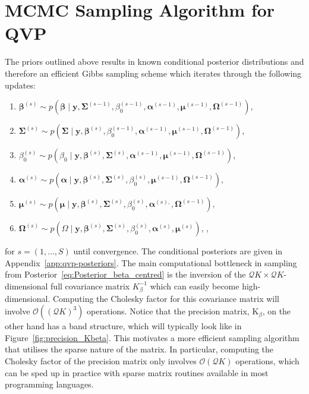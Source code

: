 \section{MCMC Sampling Algorithm for QVP}\label{sec:mcmc}
%
The priors outlined above results in known conditional posterior distributions and therefore an efficient Gibbs sampling scheme which iterates through the following updates:
\begin{enumerate}
    \item $\boldsymbol{\beta}^{(s)} \sim p(\boldsymbol{\beta}\mid \boldsymbol{y},\boldsymbol{\Sigma}^{(s-1)},\beta_0^{(s-1)},\boldsymbol{\alpha}^{(s-1)},\boldsymbol{\mu}^{(s-1)},\boldsymbol{\Omega}^{(s-1)} )$,
    \item $\boldsymbol{\Sigma}^{(s)} \sim p(\boldsymbol{\Sigma}\mid \boldsymbol{y},\boldsymbol{\beta}^{(s)},\beta_0^{(s-1)},\boldsymbol{\alpha}^{(s-1)},\boldsymbol{\mu}^{(s-1)}, \boldsymbol{\Omega}^{(s-1)})$, 
    \item $\beta_0^{(s)} \sim p(\beta_0\mid \boldsymbol{y},\boldsymbol{\beta}^{(s)},\boldsymbol{\Sigma}^{(s)},\boldsymbol{\alpha}^{(s-1)},\boldsymbol{\mu}^{(s-1)},\boldsymbol{\Omega}^{(s-1)} )$, 
    \item $\boldsymbol{\alpha}^{(s)} \sim p(\boldsymbol{\alpha} \mid \boldsymbol{y},\boldsymbol{\beta}^{(s)},\boldsymbol{\Sigma}^{(s)},\beta_0^{(s)},\boldsymbol{\mu}^{(s-1)},\boldsymbol{\Omega}^{(s-1)} )$, 
    \item $\boldsymbol{\mu}^{(s)} \sim p(\boldsymbol{\mu} \mid \boldsymbol{y},\boldsymbol{\beta}^{(s)},\boldsymbol{\Sigma}^{(s)},\beta_0^{(s)},\boldsymbol{\alpha}^{(s),},\boldsymbol{\Omega}^{(s-1)})$, 
    \item $\boldsymbol{\Omega}^{(s)} \sim p(\Omega\mid \boldsymbol{y},\boldsymbol{\beta}^{(s)},\boldsymbol{\Sigma}^{(s)},\beta_0^{(s)},\boldsymbol{\alpha}^{(s)},\boldsymbol{\mu}^{(s)} )$, ,
\end{enumerate}
%
for $s = (1,\dotsc,S)$ until convergence. The conditional posteriors are given in Appendix~\ref{app:qvp-posteriors}.
%
The main computational bottleneck in sampling from Posterior~\ref{eq:Posterior_beta_centred} is the inversion of the $\mathcal{Q}K \times \mathcal{Q} K$-dimensional full covariance matrix $K_\beta^{-1}$ which can easily become high-dimensional. Computing the Cholesky factor for this covariance matrix will involve $\mathcal{O}\left((\mathcal{Q} K)^3\right)$ operations. %
Notice that the precision matrix, $\text{K}_{\beta}$, on the other hand has a band structure, which will typically look like in Figure~\ref{fig:precision_Kbeta}. This motivates a more efficient sampling algorithm that utilises the sparse nature of the matrix. In particular, computing the Cholesky factor of the precision matrix only involves $\mathcal{O}\left(\mathcal{Q} K\right)$ operations, which can be sped up in practice with sparse matrix routines available in most programming languages.
